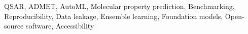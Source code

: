 QSAR, ADMET, AutoML, Molecular property prediction, Benchmarking, Reproducibility, Data leakage, Ensemble learning, Foundation models, Open-source software, Accessibility
